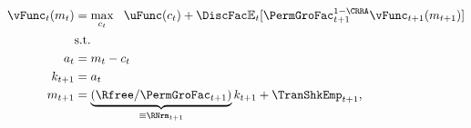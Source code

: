  \begin{equation}\begin{gathered}\begin{aligned}
        \vFunc_{t}(m_{t})  & = \max_{{c}_{t}} ~~ \uFunc(c_{t})+
       \DiscFac\Ex_{t}[ \PermGroFac_{t+1}^{1-\CRRA}\vFunc_{t+1}(m_{t+1})] \label{eq:vNormed}
        \\         & \text{s.t.}   \\
    a_{t}    & = m_{t}-c_{t}
\\  k_{t+1}  & = a_{t}
        \\      m_{t+1}  & = \underbrace{\left(\Rfree/\PermGroFac_{t+1}\right)}_{\equiv \RNrm_{t+1}}k_{t+1}+\TranShkEmp_{t+1},
      \end{aligned}\end{gathered}\end{equation}
